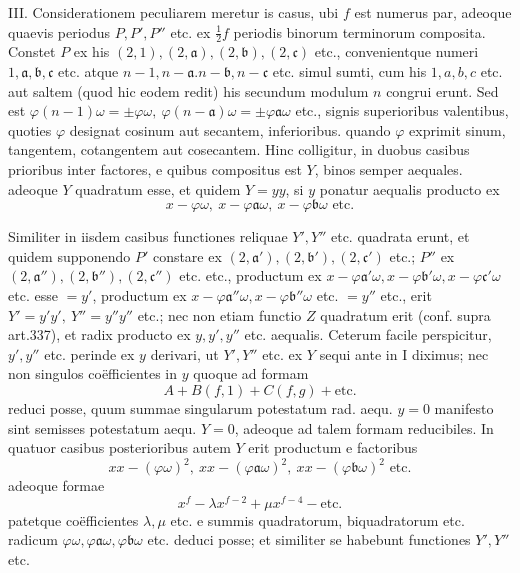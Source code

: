 III. Considerationem peculiarem meretur is casus, ubi \(f\) est numerus par, adeoque quaevis periodus \(P,\allowbreak P',\allowbreak P''\) etc. ex \(\tfrac12f\) periodis binorum terminorum composita. Constet \(P\) ex his \((2,1),\allowbreak (2,\mathfrak{a}),\allowbreak (2,\mathfrak{b}),\allowbreak (2,\mathfrak{c})\) etc., convenientque numeri \(1,\allowbreak \mathfrak{a},\allowbreak \mathfrak{b},\allowbreak \mathfrak{c}\) etc. atque \(n-1,\allowbreak n-\mathfrak{a}.n-\mathfrak{b},\allowbreak n-\mathfrak{c}\) etc. simul sumti, cum his \(1,\allowbreak a,\allowbreak b,\allowbreak c\) etc. aut saltem (quod hic eodem redit) his secundum modulum \(n\) congrui erunt. Sed est \(\varphi(n-1)\omega=\pm\varphi\omega,\allowbreak \ \varphi(n-\mathfrak{a})\omega=\pm\varphi \mathfrak{a}\omega\) etc., signis superioribus valentibus, quoties \(\varphi\) designat cosinum aut secantem, inferioribus. quando \(\varphi\) exprimit sinum, tangentem, cotangentem aut cosecantem. Hinc colligitur, in duobus casibus prioribus inter factores, e quibus compositus est \(Y\), binos semper aequales. adeoque \(Y\) quadratum esse, et quidem \(Y=yy\), si \(y\) ponatur aequalis producto ex \[x-\varphi\omega,\ x-\varphi \mathfrak{a}\omega,\ x-\varphi \mathfrak{b}\omega\text{ etc.}\]

Similiter in iisdem casibus functiones reliquae \(Y',\allowbreak Y''\) etc. quadrata erunt, et quidem supponendo \(P'\) constare ex \((2,\mathfrak{a}'),\allowbreak (2,\mathfrak{b}'),\allowbreak (2,\mathfrak{c}')\) etc.; \(P''\) ex \((2,\mathfrak{a}''),\allowbreak (2,\mathfrak{b}''),\allowbreak (2,\mathfrak{c}'')\) etc. etc., productum ex \(x-\varphi \mathfrak{a}'\omega,\allowbreak x-\varphi \mathfrak{b}'\omega,\allowbreak x-\varphi \mathfrak{c}'\omega\) etc. esse \(=y'\), productum ex \(x-\varphi \mathfrak{a}''\omega,\allowbreak x-\varphi \mathfrak{b}''\omega\) etc. \(=y''\) etc., erit \(Y'=y'y',\allowbreak \ Y''=y''y''\) etc.; nec non etiam functio \(Z\) quadratum erit (conf. supra art.337), et radix producto ex \(y,\allowbreak y',\allowbreak y''\) etc. aequalis. Ceterum facile perspicitur, \(y',\allowbreak y''\) etc. perinde ex \(y\) derivari, ut \(Y',\allowbreak Y''\) etc. ex \(Y\) sequi ante in I diximus; nec non singulos coëfficientes in \(y\) quoque ad formam \[A+B(f,1)+C(f,g)+\text{etc.}\] reduci posse, quum summae singularum potestatum rad. aequ. \(y=0\) manifesto sint semisses potestatum aequ. \(Y=0\), adeoque ad talem formam reducibiles. In quatuor casibus posterioribus autem \(Y\) erit productum e factoribus \[xx-(\varphi\omega)^2,\ xx-(\varphi \mathfrak{a}\omega)^2,\ xx-(\varphi \mathfrak{b}\omega)^2\text{ etc.}\] adeoque formae \[x^f-\lambda x^{f-2}+\mu x^{f-4}-\text{etc.}\] patetque coëfficientes \(\lambda,\allowbreak \mu\) etc. e summis quadratorum, biquadratorum etc. radicum \(\varphi\omega,\allowbreak \varphi \mathfrak{a}\omega,\allowbreak \varphi \mathfrak{b}\omega\) etc. deduci posse; et similiter se habebunt functiones \(Y',\allowbreak Y''\) etc.

